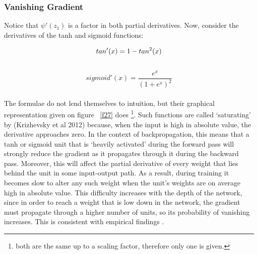 \documentclass[a4paper,11pt]{article}
\begin{document}
\subsubsection{Vanishing Gradient}

Notice that $\psi'(z_1)$ is a factor in both partial derivatives. Now, consider the derivatives of the tanh and sigmoid functions: 

\begin{equation}
tan'(x) = 1 - tan^2(x)  \\
\end{equation} \\
\begin{equation}
sigmoid'(x) = \frac{e^x}{(1 + e^x)^2}
\end{equation} \\

The formulae do not lend themselves to intuition, but their graphical representation given on figure ~\ref{f27} does \footnote{both are the same up to a scaling factor, therefore only one is given.}. Such functions are called `saturating' by (Krizhevsky et al 2012) because, when the input is high in absolute value, the derivative approaches zero. In the context of backpropagation, this means that a tanh or sigmoid unit that is `heavily activated' during the forward pass will strongly reduce the gradient as it propagates through it during the backward pass. Moreover, this will affect the partial derivative of every weight that lies behind the unit in some input-output path. As a result, during training it becomes slow to alter any such weight when the unit's weights are on average high in absolute value. This difficulty increases with the depth of the network, since in order to reach a weight that is low down in the network, the gradient must propagate through a higher number of units, so its probability of vanishing increases. This is consistent with empirical findings \cite{DL-book}. \\
\end{document}
